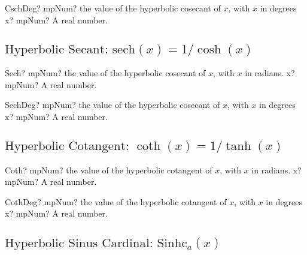 \vspace{0.6cm}

\begin{mpFunctionsExtract}
	\mpFunctionOne
	{CschDeg? mpNum? the value of the hyperbolic cosecant of $x$, with $x$ in degrees}
	{x? mpNum? A real number.}
\end{mpFunctionsExtract}






\subsection{\texorpdfstring{$\text{Hyperbolic Secant: sech}(x) = 1/\cosh(x)$}{sech}}

\begin{mpFunctionsExtract}
	\mpFunctionOne
	{Sech? mpNum? the value of the hyperbolic cosecant of $x$, with $x$ in radians.}
	{x? mpNum? A real number.}
\end{mpFunctionsExtract}

\vspace{0.6cm}

\begin{mpFunctionsExtract}
	\mpFunctionOne
	{SechDeg? mpNum? the value of the hyperbolic cosecant of $x$, with $x$ in degrees}
	{x? mpNum? A real number.}
\end{mpFunctionsExtract}






\subsection{\texorpdfstring{$\text{Hyperbolic Cotangent: }\coth(x) = 1/\tanh(x)$}{coth}}

\begin{mpFunctionsExtract}
	\mpFunctionOne
	{Coth? mpNum? the value of the hyperbolic cotangent of $x$, with $x$ in radians.}
	{x? mpNum? A real number.}
\end{mpFunctionsExtract}

\vspace{0.6cm}

\begin{mpFunctionsExtract}
	\mpFunctionOne
	{CothDeg? mpNum? the value of the hyperbolic cotangent of $x$, with $x$ in degrees}
	{x? mpNum? A real number.}
\end{mpFunctionsExtract}




\subsection{\texorpdfstring{$\text{Hyperbolic Sinus Cardinal: Sinhc}{}_a(x)$}{Sinhca}}

